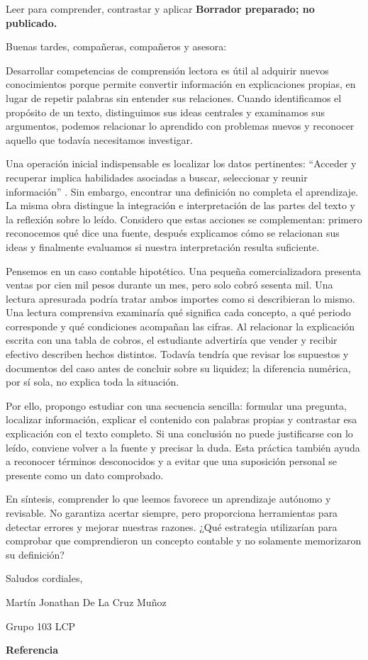 \begin{forobox}{Leer para comprender, contrastar y aplicar}
\textbf{Borrador preparado; no publicado.}

Buenas tardes, compañeras, compañeros y asesora:

Desarrollar competencias de comprensión lectora es útil al adquirir nuevos conocimientos porque permite convertir información en explicaciones propias, en lugar de repetir palabras sin entender sus relaciones. Cuando identificamos el propósito de un texto, distinguimos sus ideas centrales y examinamos sus argumentos, podemos relacionar lo aprendido con problemas nuevos y reconocer aquello que todavía necesitamos investigar.

Una operación inicial indispensable es localizar los datos pertinentes: \enquote{Acceder y recuperar implica habilidades asociadas a buscar, seleccionar y reunir información} \parencite[4]{gracida2012}. Sin embargo, encontrar una definición no completa el aprendizaje. La misma obra distingue la integración e interpretación de las partes del texto y la reflexión sobre lo leído. Considero que estas acciones se complementan: primero reconocemos qué dice una fuente, después explicamos cómo se relacionan sus ideas y finalmente evaluamos si nuestra interpretación resulta suficiente.

Pensemos en un caso contable hipotético. Una pequeña comercializadora presenta ventas por cien mil pesos durante un mes, pero solo cobró sesenta mil. Una lectura apresurada podría tratar ambos importes como si describieran lo mismo. Una lectura comprensiva examinaría qué significa cada concepto, a qué periodo corresponde y qué condiciones acompañan las cifras. Al relacionar la explicación escrita con una tabla de cobros, el estudiante advertiría que vender y recibir efectivo describen hechos distintos. Todavía tendría que revisar los supuestos y documentos del caso antes de concluir sobre su liquidez; la diferencia numérica, por sí sola, no explica toda la situación.

Por ello, propongo estudiar con una secuencia sencilla: formular una pregunta, localizar información, explicar el contenido con palabras propias y contrastar esa explicación con el texto completo. Si una conclusión no puede justificarse con lo leído, conviene volver a la fuente y precisar la duda. Esta práctica también ayuda a reconocer términos desconocidos y a evitar que una suposición personal se presente como un dato comprobado.

En síntesis, comprender lo que leemos favorece un aprendizaje autónomo y revisable. No garantiza acertar siempre, pero proporciona herramientas para detectar errores y mejorar nuestras razones. ¿Qué estrategia utilizarían para comprobar que comprendieron un concepto contable y no solamente memorizaron su definición?

Saludos cordiales,\par
Martín Jonathan De La Cruz Muñoz\par
Grupo 103 LCP

\textbf{Referencia}
\end{forobox}

